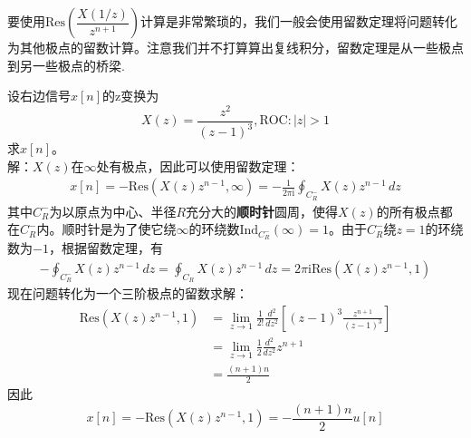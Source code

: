 \documentclass{ctexbook}
\begin{document}
要使用$\text{Res}\left(\dfrac{X(1/z)}{z^{n+1}}\right)$计算是非常繁琐的，我们一般会使用留数定理将问题转化为其他极点的留数计算。注意我们并不打算算出复线积分，留数定理是从一些极点到另一些极点的桥梁.
\begin{example}
    设右边信号$x[n]$的z变换为
    \[X(z)=\frac{z^2}{(z-1)^3},\text{ROC}:|z|>1\]
    求$x[n]$。\\
    解：$X(z)$在$\infty$处有极点，因此可以使用留数定理：
    \begin{align*}
        x[n]=-\text{Res}\left(X(z)z^{n-1},\infty\right)=-\frac{1}{2\pi \mathrm{i}}\oint_{C^-_R}X(z)z^{n-1}\,dz
    \end{align*}
    其中$C^-_R$为以原点为中心、半径$R$充分大的\textbf{顺时针}圆周，使得$X(z)$的所有极点都在$C^-_R$内。顺时针是为了使它绕$\infty$的环绕数$\text{Ind}_{C^-_R}(\infty)=1$。由于$C^-_R$绕$z=1$的环绕数为$-1$，根据留数定理，有
    \begin{align*}
        -\oint_{C^-_R}X(z)z^{n-1}\,dz=\oint_{C_R}X(z)z^{n-1}\,dz=2\pi \mathrm{i} \text{Res}\left(X(z)z^{n-1},1\right)
    \end{align*}
    现在问题转化为一个三阶极点的留数求解：
    \begin{align*}
        \text{Res}\left(X(z)z^{n-1},1\right)&=\lim_{z\to 1}\frac{1}{2!}\frac{d^2}{dz^2}\left[(z-1)^3\frac{z^{n+1}}{(z-1)^3}\right]\\
        &=\lim_{z\to 1}\frac{1}{2}\frac{d^2}{dz^2}z^{n+1}\\
        &=\frac{(n+1)n}{2}
    \end{align*}
    因此$$x[n]=-\text{Res}\left(X(z)z^{n-1},1\right)=-\frac{(n+1)n}{2}u[n]$$    
\end{example}
\end{document}
